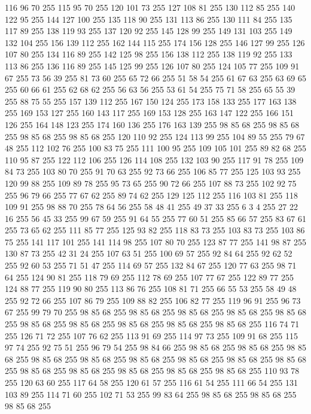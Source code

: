 116 96 70 255 115 95 70 255 120 101 73 255 127 108 81 255 130 112 85 255 140 122 95 255 144 127 100 255 135 118 90 255 131 113 86 255 130 111 84 255 135 117 89 255 138 119 93 255 137 120 92 255 145 128 99 255 149 131 103 255 149 132 104 255 156 139 112 255 162 144 115 255 174 156 128 255 146 127 99 255 126 107 80 255 134 116 89 255 142 125 98 255 156 138 112 255 138 119 92 255 133 113 86 255 136 116 89 255 145 125 99 255 126 107 80 255 124 105 77 255 109 91 67 255 73 56 39 255 81 73 60 255 65 72 66 255 51 58 54 255 61 67 63 255 63 69 65 255 60 66 61 255 62 68 62 255 56 63 56 255 53 61 54 255 75 71 58 255 65 55 39 255 88 75 55 255 157 139 112 255 167 150 124 255 173 158 133 255 177 163 138 255 169 153 127 255 160 143 117 255 169 153 128 255 163 147 122 255 166 151 126 255 164 148 123 255 174 160 136 255 176 163 139 255 98 85 68 255 98 85 68 255 98 85 68 255 98 85 68 255 120 110 92 255 124 113 99 255 104 89 55 255 79 67 48 255
112 102 76 255 100 83 75 255 111 100 95 255 109 105 101 255 89 82 68 255 110 95 87 255 122 112 106 255 126 114 108 255 132 103 90 255 117 91 78 255 109 84 73 255 103 80 70 255 91 70 63 255 92 73 66 255 106 85 77 255 125 103 93 255 120 99 88 255 109 89 78 255 95 73 65 255 90 72 66 255 107 88 73 255 102 92 75 255 96 79 66 255 77 67 62 255 89 74 62 255 129 125 112 255 116 103 81 255 118 109 91 255 98 88 70 255 78 64 56 255 58 48 41 255 49 37 33 255 6 3 4 255 27 22 16 255 56 45 33 255 99 67 59 255 91 64 55 255 77 60 51 255 85 66 57 255 83 67 61 255 73 65 62 255 111 85 77 255 125 93 82 255 118 83 73 255 103 83 73 255 103 86 75 255 141 117 101 255 141 114 98 255 107 80 70 255 123 87 77 255 141 98 87 255 130 87 73 255 42 31 24 255 107 63 51 255 100 69 57 255 92 84 64 255 92 62 52 255 92 60 53 255 71 51 47 255 114 69 57 255 132 84 67 255 120 77 63 255 98 71 64 255 124 90 81 255
118 79 69 255 112 78 69 255 107 77 67 255 122 89 77 255 124 88 77 255 119 90 80 255 113 86 76 255 108 81 71 255 66 55 53 255 58 49 48 255 92 72 66 255 107 86 79 255 109 88 82 255 106 82 77 255 119 96 91 255 96 73 67 255 99 79 70 255 98 85 68 255 98 85 68 255 98 85 68 255 98 85 68 255 98 85 68 255 98 85 68 255 98 85 68 255 98 85 68 255 98 85 68 255 98 85 68 255 116 74 71 255 126 71 72 255 107 76 62 255 113 91 69 255 114 97 73 255 109 91 68 255 115 97 74 255 92 75 51 255 96 79 54 255 98 84 66 255 98 85 68 255 98 85 68 255 98 85 68 255 98 85 68 255 98 85 68 255 98 85 68 255 98 85 68 255 98 85 68 255 98 85 68 255 98 85 68 255 98 85 68 255 98 85 68 255 98 85 68 255 98 85 68 255 110 93 78 255 120 63 60 255 117 64 58 255 120 61 57 255 116 61 54 255 111 66 54 255 131 103 89 255 114 71 60 255 102 71 53 255 99 83 64 255 98 85 68 255 98 85 68 255 98 85 68 255
